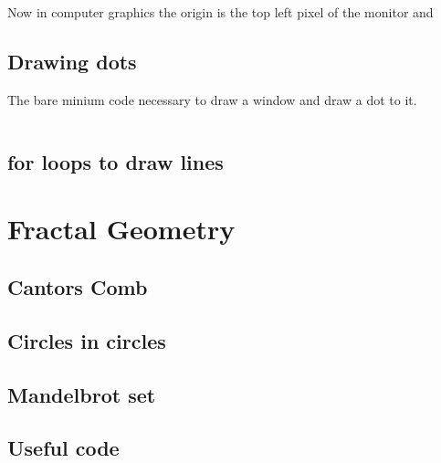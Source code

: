    Now in computer graphics the origin is the top left pixel of the monitor 
    and 
\subsection{Drawing dots}
    The bare minium code necessary to draw a window and draw a dot to it. 
    \inputminted{c}{draw_dot.c}
\subsection{for loops to draw lines}

\section{Fractal Geometry}
\subsection{Cantors Comb}
\subsection{Circles in circles}
\subsection{Mandelbrot set}

\begin{appendices}
    \section{Useful code}
    \inputminted{c++}{complex.hpp}
\end{appendices}
